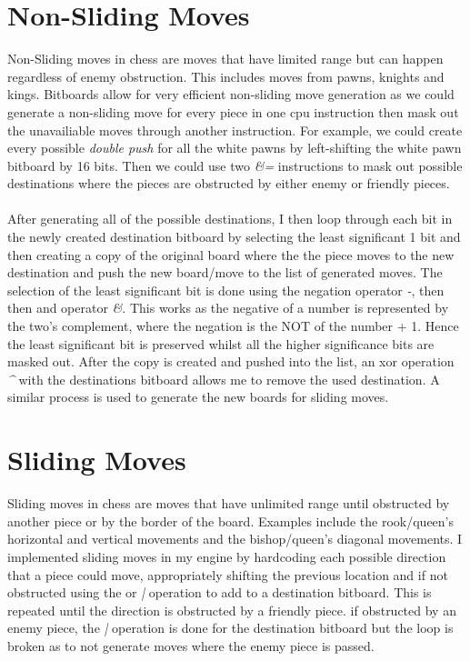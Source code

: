 \section{Non-Sliding Moves}
Non-Sliding moves in chess are moves that have limited range but can happen regardless of enemy obstruction. This includes moves from pawns, knights and kings. Bitboards allow for very efficient non-sliding move generation as we could generate a non-sliding move for every piece in one cpu instruction then mask out the unavailiable moves through another instruction. For example, we could create every possible \textit{double push} for all the white pawns by left-shifting the white pawn bitboard by 16 bits. Then we could use two \textit{\&=} instructions to mask out possible destinations where the pieces are obstructed by either enemy or friendly pieces.\\\\
After generating all of the possible destinations, I then loop through each bit in the newly created destination bitboard by selecting the least significant 1 bit and then creating a copy of the original board where the the piece moves to the new destination and push the new board/move to the list of generated moves. The selection of the least significant bit is done using the negation operator \textit{-}, then then and operator \textit{\&}. This works as the negative of a number is represented by the two's complement, where the negation is the NOT of the number + 1. Hence the least significant bit is preserved whilst all the higher significance bits are masked out. After the copy is created and pushed into the list, an xor operation \textit{\^} with the destinations bitboard allows me to remove the used destination. A similar process is used to generate the new boards for sliding moves.
\section{Sliding Moves}
Sliding moves in chess are moves that have unlimited range until obstructed by another piece or by the border of the board. Examples include the rook/queen's horizontal and vertical movements and the bishop/queen's diagonal movements. I implemented sliding moves in my engine by hardcoding each possible direction that a piece could move, appropriately shifting the previous location and if not obstructed using the or \textit{|} operation to add to a destination bitboard. This is repeated until the direction is obstructed by a friendly piece. if obstructed by an enemy piece, the \textit{|} operation is done for the destination bitboard but the loop is broken as to not generate moves where the enemy piece is passed.
